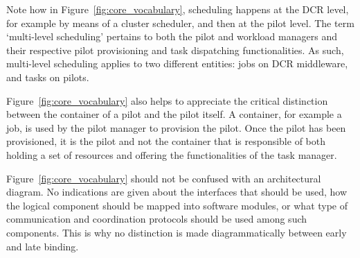 \documentclass{sig-alternate}
\begin{document}

Note how in Figure~\ref{fig:core_vocabulary}, scheduling happens at the DCR
level, for example by means of a cluster scheduler, and then at the pilot level.
The term `multi-level scheduling' pertains to both the pilot and workload
managers and their respective pilot provisioning and task dispatching
functionalities. As such, multi-level scheduling applies to two different
entities: jobs on DCR middleware, and tasks on pilots. 

Figure~\ref{fig:core_vocabulary} also helps to appreciate the critical
distinction between the container of a pilot and the pilot itself. A container,
for example a job, is used by the pilot manager to provision the pilot. Once the
pilot has been provisioned, it is the pilot and not the container that is
responsible of both holding a set of resources and offering the functionalities
of the task manager.


Figure~\ref{fig:core_vocabulary} should not be confused with an architectural
diagram. No indications are given about the interfaces that should be used, how
the logical component should be mapped into software modules, or what type of
communication and coordination protocols should be used among such components.
This is why no distinction is made diagrammatically between early and late
binding.

\end{document}
